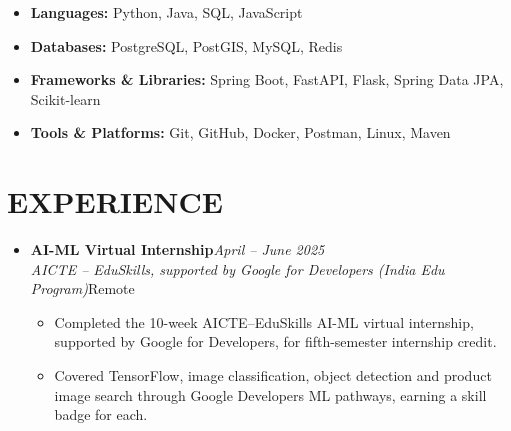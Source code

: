 \documentclass[11pt,a4paper]{article}
\newcommand{\resumeSubheading}[4]{%
    \item[]
    \noindent
    \textbf{#1}\hfill\textit{#2}\\
    \textit{\small #3}\hfill\small #4
    \par\vspace{0.8pt}
}
\newcommand{\resumeItem}[1]{%
    \item\small #1
}
\begin{document}
\begin{itemize}[leftmargin=0pt]

\item[]\small{\textbf{Languages:} Python, Java, SQL, JavaScript}
\vspace{1.5pt}
\item[]\small{\textbf{Databases:} PostgreSQL, PostGIS, MySQL, Redis}
\vspace{1.5pt}
\item[]\small{\textbf{Frameworks \& Libraries:} Spring Boot, FastAPI, Flask, Spring Data JPA, Scikit-learn}
\vspace{1.5pt}
\item[]\small{\textbf{Tools \& Platforms:} Git, GitHub, Docker, Postman, Linux, Maven}

\end{itemize}


\section{EXPERIENCE}

\begin{itemize}[leftmargin=0pt]

\resumeSubheading
{AI-ML Virtual Internship}
{April -- June 2025}
{AICTE -- EduSkills, supported by Google for Developers (India Edu Program)}
{Remote}

\begin{itemize}

\resumeItem{
Completed the 10-week AICTE--EduSkills AI-ML virtual internship, supported by Google for Developers, for fifth-semester internship credit.
}

\resumeItem{
Covered TensorFlow, image classification, object detection and product image search through Google Developers ML pathways, earning a skill badge for each.
}

\end{itemize}

\end{itemize}

\end{document}
